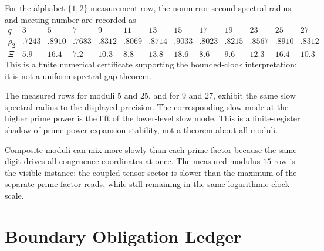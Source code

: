 \begin{principle}
\label{prin:innovation-input-boundary-measured-congruence-table}
For the alphabet $\{1,2\}$ measurement row, the nonmirror second spectral
radius and meeting number are recorded as
$$
\begin{array}{c|cccccccccccc}
q&3&5&7&9&11&13&15&17&19&23&25&27\\
\hline
\rho_2&.7243&.8910&.7683&.8312&.8069&.8714&.9033&.8023&.8215&.8567&.8910&.8312\\
\Xi&5.9&16.4&7.2&10.3&8.8&13.8&18.6&8.6&9.6&12.3&16.4&10.3
\end{array}
$$
This is a finite numerical certificate supporting the bounded-clock
interpretation; it is not a uniform spectral-gap theorem.
\end{principle}

\begin{principle}
\label{prin:innovation-input-boundary-prime-power-freezing}
The measured rows for moduli $5$ and $25$, and for $9$ and $27$, exhibit
the same slow spectral radius to the displayed precision. The corresponding
slow mode at the higher prime power is the lift of the lower-level slow
mode. This is a finite-register shadow of prime-power expansion stability,
not a theorem about all moduli.
\end{principle}

\begin{principle}
\label{prin:innovation-input-boundary-chinese-remainder-penalty}
Composite moduli can mix more slowly than each prime factor because the
same digit drives all congruence coordinates at once. The measured modulus
$15$ row is the visible instance: the coupled tensor sector is slower than
the maximum of the separate prime-factor reads, while still remaining in
the same logarithmic clock scale.
\end{principle}

\section{Boundary Obligation Ledger}
\label{sec:innovation-input-boundary-obligation-ledger}

